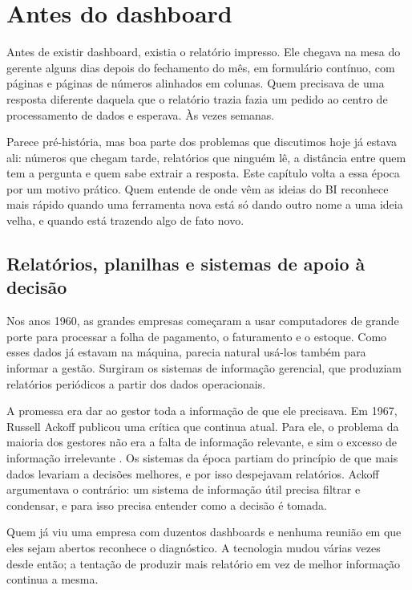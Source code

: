 \chapter{Antes do dashboard}
\label{cap:origens}

Antes de existir dashboard, existia o relatório impresso. Ele chegava na mesa do
gerente alguns dias depois do fechamento do mês, em formulário contínuo, com páginas e
páginas de números alinhados em colunas. Quem precisava de uma resposta diferente
daquela que o relatório trazia fazia um pedido ao centro de processamento de dados e
esperava. Às vezes semanas.

Parece pré-história, mas boa parte dos problemas que discutimos hoje já estava ali:
números que chegam tarde, relatórios que ninguém lê, a distância entre quem tem a
pergunta e quem sabe extrair a resposta. Este capítulo volta a essa época por um motivo
prático. Quem entende de onde vêm as ideias do BI reconhece mais rápido quando uma
ferramenta nova está só dando outro nome a uma ideia velha, e quando está trazendo algo
de fato novo.

\section{Relatórios, planilhas e sistemas de apoio à decisão}
\label{sec:sad}

Nos anos 1960, as grandes empresas começaram a usar computadores de grande porte para
processar a folha de pagamento, o faturamento e o estoque. Como esses dados já estavam
na máquina, parecia natural usá-los também para informar a gestão. Surgiram os sistemas
de informação gerencial, que produziam relatórios periódicos a partir dos dados
operacionais.

A promessa era dar ao gestor toda a informação de que ele precisava. Em 1967, Russell
Ackoff publicou uma crítica que continua atual. Para ele, o problema da maioria dos
gestores não era a falta de informação relevante, e sim o excesso de informação
irrelevante \parencite{ackoff1967}. Os sistemas da época partiam do princípio de que mais
dados levariam a decisões melhores, e por isso despejavam relatórios. Ackoff argumentava
o contrário: um sistema de informação útil precisa filtrar e condensar, e para isso
precisa entender como a decisão é tomada.

Quem já viu uma empresa com duzentos dashboards e nenhuma reunião em que eles sejam
abertos reconhece o diagnóstico. A tecnologia mudou várias vezes desde então; a
tentação de produzir mais relatório em vez de melhor informação continua a mesma.

